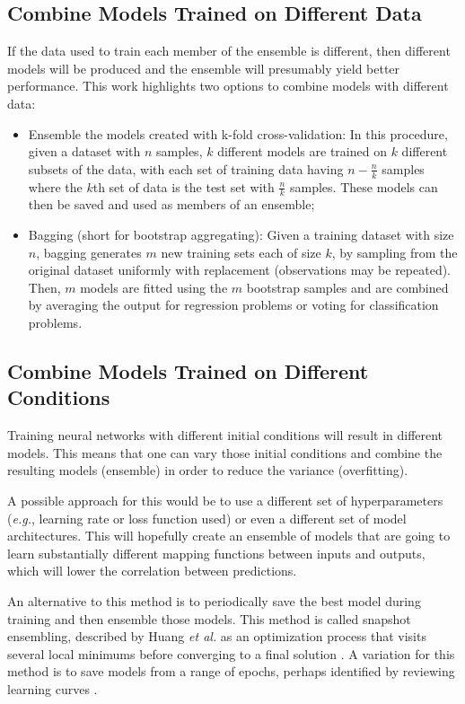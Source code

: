 \subsection{Combine Models Trained on Different Data}
    If the data used to train each member of the ensemble is different, then different models will be produced and the ensemble will presumably yield better performance. This work highlights two options to combine models with different data: 
    \begin{itemize}
        \item Ensemble the models created with k-fold cross-validation: In this procedure, given a dataset with $n$ samples, $k$ different models are trained on $k$ different subsets of the data, with each set of training data having $n-\frac{n}{k}$ samples where the $k$th set of data is the test set with $\frac{n}{k}$ samples. These models can then be saved and used as members of an ensemble;
        \item Bagging (short for bootstrap aggregating): Given a training dataset with size $n$, bagging generates $m$ new training sets each of size $k$, by sampling from the original dataset uniformly with replacement (observations may be repeated). Then, $m$ models are fitted using the $m$ bootstrap samples and are combined by averaging the output for regression problems or voting for classification problems.
    \end{itemize}
    
\subsection{Combine Models Trained on Different Conditions}
    Training neural networks with different initial conditions will result in different models. This means that one can vary those initial conditions and combine the resulting models (ensemble) in order to reduce the variance (overfitting). \par
    
    A possible approach for this would be to use a different set of hyperparameters (\textit{e.g.}, learning rate or loss function used) or even a different set of model architectures. This will hopefully create an ensemble of models that are going to learn substantially different mapping functions between inputs and outputs, which will lower the correlation between predictions. \par
    
    An alternative to this method is to periodically save the best model during training and then ensemble those models. This method is called snapshot ensembling, described by Huang \textit{et al.} as an optimization process that visits several local minimums before converging to a final solution \cite{snapshot}. A variation for this method is to save models from a range of epochs, perhaps identified by reviewing learning curves \cite{horizontalvertical}. \par
        
